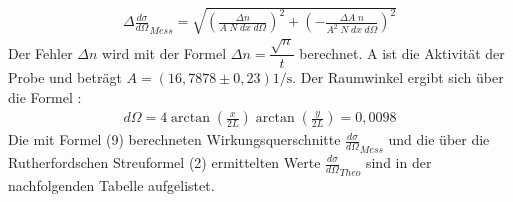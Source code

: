 \documentclass{article}
\begin{document}
\begin{align}
\Delta\frac{d\sigma}{d\Omega}_{Mess}= \sqrt{\left(\frac{\Delta n}{A\; N \; dx \; d\Omega}\right)^2+ \left(-\frac{\Delta A \;n}{A^2 \; N\; dx \; d\Omega}\right)^2}
\end{align}
Der Fehler $\Delta n$ wird mit der Formel $\Delta n=\dfrac{\sqrt{n}}{t}$ berechnet. A ist die Aktivität der Probe und beträgt $A=(16,7878\pm 0,23) \text{1/s}$. Der Raumwinkel ergibt sich über die Formel :
\begin{align}
d\Omega= 4 \arctan\left(\frac{x}{2L}\right) \arctan\left(\frac{y}{2L} \right) =0,0098
\end{align}
Die mit Formel (9) berechneten Wirkungsquerschnitte $\frac{d\sigma}{d\Omega}_{Mess}$ und die  über die Rutherfordschen Streuformel (2) ermittelten Werte $\frac{d\sigma}{d\Omega}_{Theo}$ sind in der nachfolgenden Tabelle aufgelistet.
\end{document}
